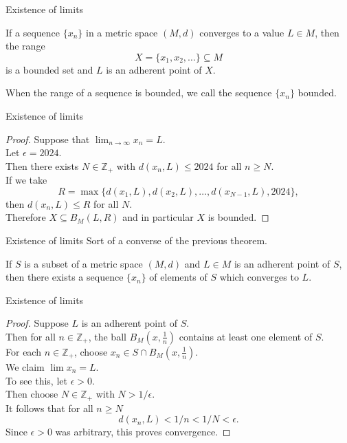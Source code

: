 \documentclass{beamer}
\begin{document}
\begin{frame}{Existence of limits}
\begin{thm}
If a sequence $\{x_n\}$ in a metric space $(M,d)$ converges to a value $L\in M$, then the range
$$X = \{x_1,x_2,\dots\}\subseteq M$$
is a bounded set and $L$ is an adherent point of $X$.
\end{thm}
\pause
When the range of a sequence is bounded, we call the sequence $\{x_n\}$ bounded.
\end{frame}

\begin{frame}{Existence of limits}
\begin{proof}
Suppose that $\lim_{n\rightarrow\infty} x_n = L$.\\
\pause
Let $\epsilon = 2024$.\\
\pause
Then there exists $N\in\mathbb{Z}_+$ with $d(x_n,L)\leq 2024$ for all $n\geq N$.\\
\pause
If we take
$$R = \max\{d(x_1,L),d(x_2,L),\dots, d(x_{N-1},L),2024\},$$
\pause
then $d(x_n,L)\leq R$ for all $N$.\\
\pause
Therefore $X\subseteq B_M(L,R)$ and in particular $X$ is bounded.
\end{proof}
\end{frame}

\begin{frame}{Existence of limits}
Sort of a converse of the previous theorem.
\pause
\begin{thm}
If $S$ is a subset of a metric space $(M,d)$ and $L\in M$ is an adherent point of $S$, then there exists a sequence $\{x_n\}$ of elements of $S$ which converges to $L$.
\end{thm}
\end{frame}

\begin{frame}{Existence of limits}
\begin{proof}
Suppose $L$ is an adherent point of $S$.\\
\pause
Then for all $n\in\mathbb{Z}_+$, the ball $B_M(x,\frac{1}{n})$ contains at least one element of $S$.\\
\pause
For each $n\in\mathbb{Z}_+$, choose $x_n\in S\cap B_M(x,\frac{1}{n})$.\\
\pause
We claim $\lim x_n = L$.\\
\pause
To see this, let $\epsilon > 0$.\\
\pause
Then choose $N\in\mathbb{Z}_+$ with $N>1/\epsilon$.\\
\pause
It follows that for all $n\geq N$
$$d(x_n,L) < 1/n < 1/N < \epsilon.$$
\pause
Since $\epsilon > 0$ was arbitrary, this proves convergence.
\end{proof}
\end{frame}
\end{document}
